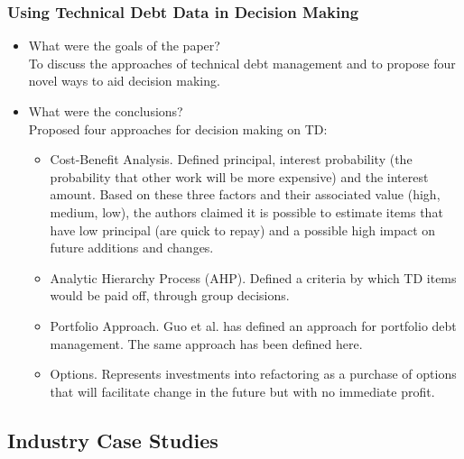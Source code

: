 \documentclass{mprop}
\begin{document}
\subsubsection{Using Technical Debt Data in Decision Making} \cite{Seaman2012}
\begin{itemize}
	\item What were the goals of the paper? \\
	      To discuss the approaches of technical debt management and to propose four novel ways to aid decision making.
	\item What were the conclusions? \\
	      Proposed four approaches for decision making on TD:
	      \begin{itemize}
		      \item Cost-Benefit Analysis. Defined principal, interest probability (the probability that other work will be more expensive) and the interest amount.
		            Based on these three factors and their associated value (high, medium, low), the authors claimed it is possible to estimate items that have low principal (are quick to repay) and a possible high impact on future additions and changes.
		      \item Analytic Hierarchy Process (AHP). Defined a criteria by which TD items would be paid off, through group decisions.
		      \item Portfolio Approach. Guo et al. \cite{Guo2011} has defined an approach for portfolio debt management. The same approach has been defined here.
		      \item Options. Represents investments into refactoring as a purchase of options that will facilitate change in the future but with no immediate profit.
	      \end{itemize}
\end{itemize}

\subsection{Industry Case Studies}
\end{document}

